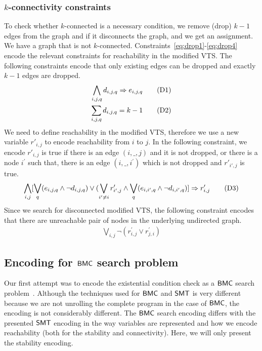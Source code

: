\subsubsection{$k$-connectivity constraints}
To check whether $k$-connected is a necessary condition, we remove (drop) $k-1$ edges from the graph and if it
disconnects the graph, and we get an assignment. We have a graph that is not  $k$-connected.
%
Constraints~\ref{eq:drop1}-\ref{eq:drop4}
encode the relevant constraints for reachability
in the modified VTS. 
%
The following constraints encode that only
existing edges can be dropped and exactly $k-1$ edges are dropped.
\begin{align}
  \bigwedge\limits_{i,j,q} d_{i,j,q} \Rightarrow e_{i,j,q}  \tag{D1}\label{eq:drop1}\\
  \sum_{i,j,q} d_{i,j,q} = k-1
  \tag{D2}\label{eq:drop2}
\end{align}
We need to define reachability in the modified VTS, therefore we use
a new variable $r'_{i,j}$ to encode reachability from $i$ to $j$.
In the following constraint, we encode $r'_{i,j}$ is true if there is an
edge $(i,\_,j)$ and it is not dropped, or there is a node
$i^{\prime}$ such that, there is an edge $(i,\_,i^{\prime})$ which is
not dropped and $r'_{i',j}$ is true.
\begin{align}
\bigwedge\limits_{i,j}  [\bigvee_{q} (e_{i,j,q} \land  \neg d_{i,j,q}) \lor  (\bigvee_{i' \neq i}  r^{\prime}_{i',j} \land  \bigvee_{q} (e_{i,i',q} \land \neg d_{i,i',q}) ] \Rightarrow r^{\prime}_{i,j}  
  \tag{D3}\label{eq:drop3}
\end{align}
Since we search for disconnected modified VTS,
the following constraint encodes that there are 
unreachable pair of nodes in the underlying undirected graph.
\begin{align}
   \bigvee\limits_{i,j} \neg (r^{\prime}_{i,j} \lor r^{\prime}_{j,i})
  \tag{D4}\label{eq:drop4}
\end{align}



\subsection{Encoding for $\mathsf{BMC}$ search problem}

Our first attempt was to encode the existential condition check as a $\mathsf{BMC}$ search problem~\cite{shukla2017discovering}.
%
%
Although the techniques used for $\mathsf{BMC}$ and $\mathsf{SMT}$ is very different because we are not unrolling the complete program in the case of $\mathsf{BMC}$, the encoding is not considerably different.
% 
The $\mathsf{BMC}$ search encoding differs with the presented $\mathsf{SMT}$ encoding in the way variables are represented and how we encode reachability (both for the stability and connectivity).  
%
Here, we will only present the stability encoding.


